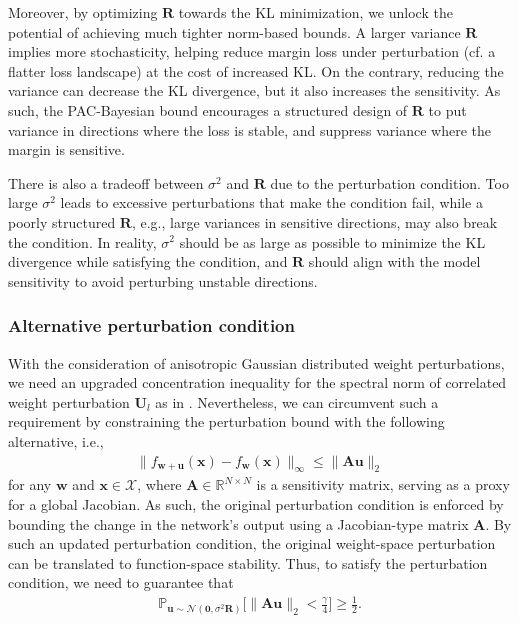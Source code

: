 \documentclass[journal]{IEEEtran} %
\def\vzero{{\bm{0}}}
\def\vu{{\bm{u}}}
\def\vw{{\bm{w}}}
\def\vx{{\bm{x}}}
\def\mA{{\bm{A}}}
\def\mR{{\bm{R}}}
\def\mU{{\bm{U}}}
\def\gN{{\mathcal{N}}}
\def\gX{{\mathcal{X}}}
\newcommand{\R}{\mathbb{R}}
\newcommand{\Norm}[1]{\|#1\|}
\begin{document}
Moreover, by optimizing $\mR$ towards the KL minimization, we unlock the potential of achieving much tighter norm-based bounds.
%
A larger variance $\mR$ implies more stochasticity, helping reduce margin loss under perturbation (cf. a flatter loss landscape) at the cost of increased KL. On the contrary, reducing the variance can decrease the KL divergence, but it also increases the sensitivity.
As such, the PAC-Bayesian bound encourages a structured design of $\mR$ to put variance in directions where the loss is stable, and suppress variance where the margin is sensitive.

There is also a tradeoff between $\sigma^2$ and $\mR$ due to the perturbation condition. Too large $\sigma^2$ leads to excessive perturbations that make the condition fail, while a poorly structured $\mR$, e.g., large variances in sensitive directions, may also break the condition. In reality, $\sigma^2$ should be as large as possible to minimize the KL divergence while satisfying the condition, and $\mR$ should align with the model sensitivity to avoid perturbing unstable directions.

\subsubsection{Alternative perturbation condition}
With the consideration of anisotropic Gaussian distributed weight perturbations, we need an upgraded concentration inequality for the spectral norm of correlated weight perturbation $\mU_l$ as in \cite{11027475}. Nevertheless, we can circumvent such a requirement by constraining the perturbation bound with the following alternative, i.e.,
\begin{align} \label{eq:pert-cond}
    \|f_{\vw+\vu}(\vx)-f_{\vw}(\vx)\|_{\infty} \le \|\mA \vu\|_2
\end{align}
for any $\vw$ and $\vx \in \gX$, 
where $\mA \in \R^{N \times N}$ is a sensitivity matrix, serving as a proxy for a global Jacobian. As such, the original perturbation condition is enforced by bounding the change in the network’s output using a Jacobian-type matrix $\mA$.
By such an updated perturbation condition, the original weight-space perturbation can be translated to function-space stability.
Thus, to satisfy the perturbation condition, we need to guarantee that
\begin{align}
    \mathbb{P}_{\vu \sim \gN(\vzero,\sigma^2 \mR)} \big[ \Norm{\mA \vu}_2 < \frac{\gamma}{4} \big] \ge \frac{1}{2}.
\end{align}
\end{document}
